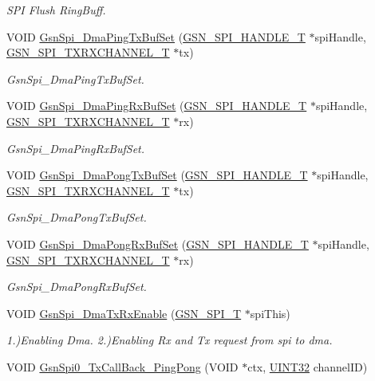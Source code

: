 \begin{DoxyCompactItemize}
\begin{DoxyCompactList}\small\item\em SPI Flush RingBuff. \end{DoxyCompactList}\item 
VOID \hyperlink{a00655_ga3b883bf551a2d5a45324f2c9fb192dde}{GsnSpi\_\-DmaPingTxBufSet} (\hyperlink{a00238}{GSN\_\-SPI\_\-HANDLE\_\-T} $\ast$spiHandle, \hyperlink{a00241}{GSN\_\-SPI\_\-TXRXCHANNEL\_\-T} $\ast$tx)
\begin{DoxyCompactList}\small\item\em GsnSpi\_\-DmaPingTxBufSet. \end{DoxyCompactList}\item 
VOID \hyperlink{a00655_ga1240aab47d221d687c55d959f9338f38}{GsnSpi\_\-DmaPingRxBufSet} (\hyperlink{a00238}{GSN\_\-SPI\_\-HANDLE\_\-T} $\ast$spiHandle, \hyperlink{a00241}{GSN\_\-SPI\_\-TXRXCHANNEL\_\-T} $\ast$rx)
\begin{DoxyCompactList}\small\item\em GsnSpi\_\-DmaPingRxBufSet. \end{DoxyCompactList}\item 
VOID \hyperlink{a00655_ga12f4ac188844f68f5b615c317544d789}{GsnSpi\_\-DmaPongTxBufSet} (\hyperlink{a00238}{GSN\_\-SPI\_\-HANDLE\_\-T} $\ast$spiHandle, \hyperlink{a00241}{GSN\_\-SPI\_\-TXRXCHANNEL\_\-T} $\ast$tx)
\begin{DoxyCompactList}\small\item\em GsnSpi\_\-DmaPongTxBufSet. \end{DoxyCompactList}\item 
VOID \hyperlink{a00655_ga67638cf09d337fe02b6987dde904af5e}{GsnSpi\_\-DmaPongRxBufSet} (\hyperlink{a00238}{GSN\_\-SPI\_\-HANDLE\_\-T} $\ast$spiHandle, \hyperlink{a00241}{GSN\_\-SPI\_\-TXRXCHANNEL\_\-T} $\ast$rx)
\begin{DoxyCompactList}\small\item\em GsnSpi\_\-DmaPongRxBufSet. \end{DoxyCompactList}\item 
VOID \hyperlink{a00655_ga78b8fecdc2cd5a6696de7b0969572670}{GsnSpi\_\-DmaTxRxEnable} (\hyperlink{a00230}{GSN\_\-SPI\_\-T} $\ast$spiThis)
\begin{DoxyCompactList}\small\item\em 1.)Enabling Dma. 2.)Enabling Rx and Tx request from spi to dma. \end{DoxyCompactList}\item 
VOID \hyperlink{a00655_ga4b5207e6c3b7b0ba513a8efe4e0c58f9}{GsnSpi0\_\-TxCallBack\_\-PingPong} (VOID $\ast$ctx, \hyperlink{a00660_gae1e6edbbc26d6fbc71a90190d0266018}{UINT32} channelID)

\end{DoxyCompactItemize}
